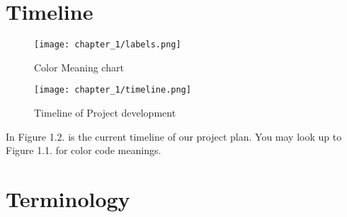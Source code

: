 \clearpage

\section{Timeline}
\label{section:timeline}
\begin{figure}[h]
    \centering
    \texttt{[image: chapter\_1/labels.png]}
    \caption{Color Meaning chart}

\end{figure}
\begin{figure}[h]
    \centering
    \texttt{[image: chapter\_1/timeline.png]}
    \caption{Timeline of Project development}

\end{figure}

In Figure 1.2. is the current timeline of our project plan.
You may look up to Figure 1.1. for color code meanings.

\section{Terminology}
\label{section:terminology}

